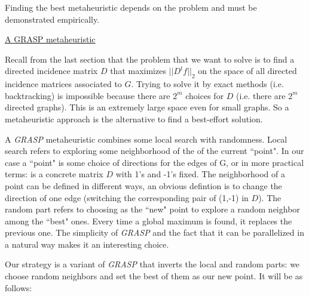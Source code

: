 \documentclass[a4paper,11pt]{article}
\begin{document}
Finding the best metaheuristic depends on the problem and must be 
demonstrated empirically.

\bigskip

\underline{A GRASP metaheuristic}

\bigskip

Recall from the last section that the problem that we want to solve is 
to find a directed incidence matrix $D$ that maximizes $||D^t f||_2$ on
the space of all directed incidence matrices associated to $G$. Trying 
to solve it by exact methods (i.e. backtracking) is impossible because 
there are $2^m$ choices for $D$ (i.e. there are $2^m$ directed graphs). 
This is an extremely large space even for small graphs. So a 
metaheuristic approach is the alternative to find a best-effort 
solution.

\bigskip

A \textit{GRASP} metaheuristic combines some local search 
with randomness. Local search refers to exploring some neighborhood of 
the of the current ``point". In our case a ``point" is some choice of 
directions for the edges of G, or in more practical terms: is a 
concrete matrix $D$ with 1's and -1's fixed. The neighborhood of a 
point can be defined in different ways, an obvious defintion is to 
change the direction of one edge (switching the corresponding pair of 
(1,-1) in $D$). The random part refers to choosing as the ``new" point 
to explore a random neighbor among the ``best" ones. Every time a global 
maximum is found, it replaces the previous one. The simplicity of 
\textit{GRASP} and the fact that it can be parallelized in a natural 
way makes it an interesting choice.

\bigskip

Our strategy is a variant of \textit{GRASP} that inverts the local and 
random parts: we choose random neighbors and set the best of them as 
our new point. It will be as follows:
\end{document}
